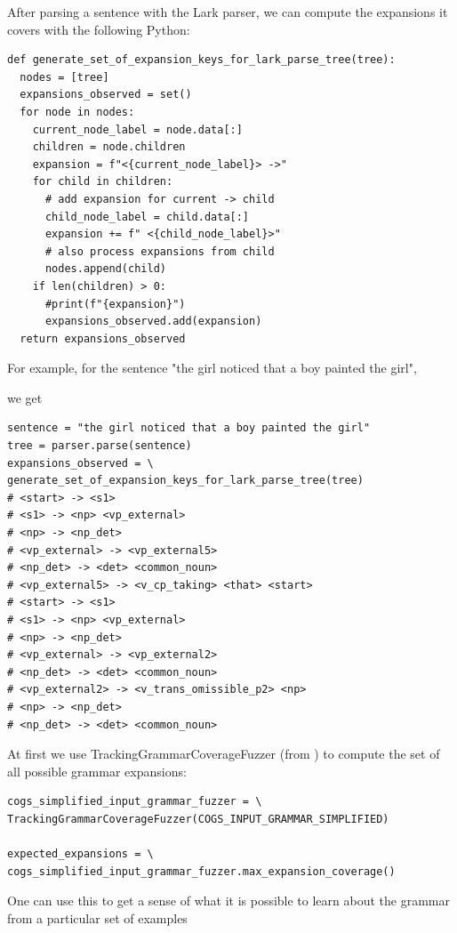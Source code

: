 \documentclass[11pt]{article}
\begin{document}
After parsing a sentence with the Lark parser, we can compute the expansions it covers with the following Python:
\begin{tiny}
\begin{verbatim}
def generate_set_of_expansion_keys_for_lark_parse_tree(tree):
  nodes = [tree]
  expansions_observed = set()
  for node in nodes:
    current_node_label = node.data[:]
    children = node.children
    expansion = f"<{current_node_label}> ->"
    for child in children:
      # add expansion for current -> child
      child_node_label = child.data[:]
      expansion += f" <{child_node_label}>"
      # also process expansions from child
      nodes.append(child)
    if len(children) > 0:
      #print(f"{expansion}")
      expansions_observed.add(expansion)
  return expansions_observed
\end{verbatim}
\end{tiny}

For example, for the sentence "the girl noticed that a boy painted the girl",

we get
\begin{tiny}
\begin{verbatim}
sentence = "the girl noticed that a boy painted the girl"
tree = parser.parse(sentence)
expansions_observed = \
generate_set_of_expansion_keys_for_lark_parse_tree(tree)
# <start> -> <s1>
# <s1> -> <np> <vp_external>
# <np> -> <np_det>
# <vp_external> -> <vp_external5>
# <np_det> -> <det> <common_noun>
# <vp_external5> -> <v_cp_taking> <that> <start>
# <start> -> <s1>
# <s1> -> <np> <vp_external>
# <np> -> <np_det>
# <vp_external> -> <vp_external2>
# <np_det> -> <det> <common_noun>
# <vp_external2> -> <v_trans_omissible_p2> <np>
# <np> -> <np_det>
# <np_det> -> <det> <common_noun>
\end{verbatim}
\end{tiny}

At first we use TrackingGrammarCoverageFuzzer (from \citep{fuzzingbook2023:GrammarCoverageFuzzer}) to compute the set of all possible grammar expansions:
\begin{tiny}
\begin{verbatim}
cogs_simplified_input_grammar_fuzzer = \
TrackingGrammarCoverageFuzzer(COGS_INPUT_GRAMMAR_SIMPLIFIED)

expected_expansions = \
cogs_simplified_input_grammar_fuzzer.max_expansion_coverage()
\end{verbatim}
\end{tiny}

One can use this to get a sense of what it is possible to learn about the grammar from a particular set of examples
\end{document}
